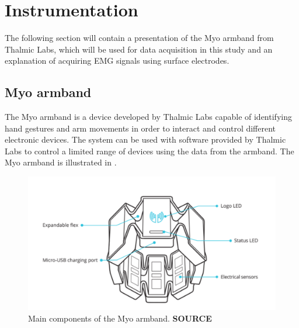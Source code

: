 \section{Instrumentation}

The following section will contain a presentation of the Myo armband from Thalmic Labs, which will be used for data acquisition in this study and an explanation of acquiring EMG signals using surface electrodes.

\subsection{Myo armband}

The Myo armband is a device developed by Thalmic Labs capable of identifying hand gestures and arm movements in order to interact and control different electronic devices. The system can be used with software provided by Thalmic Labs to control a limited range of devices using the data from the armband.
The Myo armband is illustrated in . 

\begin{figure}[H]                    
	\includegraphics[width=.5\textwidth]{figures/myob/armband}  %
	\caption{Main components of the Myo armband. \textbf{SOURCE}}
	\label{fig:armband}  %
\end{figure}




